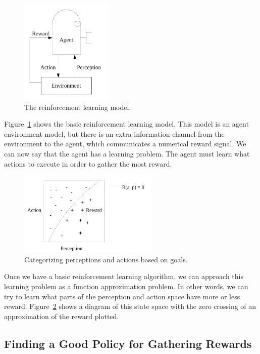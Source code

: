 \begin{figure}[bth]
  \center
  \includegraphics[height=5cm]{gfx/reinforcement_learning}
  \caption[The reinforcement learning model]{The reinforcement learning model.}
  \label{fig:reinforcement_learning}
\end{figure}

Figure~\ref{fig:reinforcement_learning} shows the basic reinforcement
learning model.  This model is an agent environment model, but there
is an extra information channel from the environment to the agent,
which communicates a numerical reward signal.  We can now say that the
agent has a learning problem.  The agent must learn what actions to
execute in order to gather the most reward.

\begin{figure}[bth]
  \center
  \includegraphics[height=4cm]{gfx/perception_categorization}
  \caption[Categorizing perceptions and actions based on goals]{Categorizing perceptions and actions based on goals.}
  \label{fig:perception_categorization}
\end{figure}

Once we have a basic reinforcement learning algorithm, we can approach
this learning problem as a function approximation problem.  In other
words, we can try to learn what parts of the perception and action
space have more or less reward.
Figure~\ref{fig:perception_categorization} shows a diagram of this
state space with the zero crossing of an approximation of the reward
plotted.

\subsection{Finding a Good Policy for Gathering Rewards}

